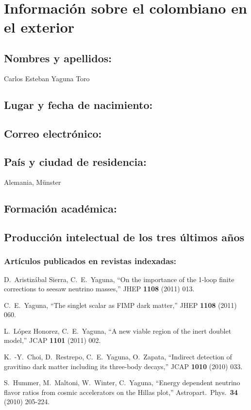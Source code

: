 \section{Información sobre el colombiano en el exterior}
\subsection{Nombres y apellidos: }
Carlos Esteban Yaguna Toro
\subsection{Lugar y fecha de nacimiento: }
\fnyaguna
\subsection{Correo electrónico: }
\emyaguna
\subsection{País y ciudad de residencia: }
Alemania, M\"unster
\subsection{Formación académica:}
\subsection{Producción intelectual de los tres últimos años}
\subsubsection{Artículos publicados en revistas indexadas:}
  D.~Aristizábal Sierra, C.~E.~Yaguna,
  ``On the importance of the 1-loop finite corrections to seesaw neutrino masses,''
  JHEP {\bf 1108 } (2011)  013.

  C.~E.~Yaguna,
  ``The singlet scalar as FIMP dark matter,''
  JHEP {\bf 1108 } (2011)  060.

  L.~López Honorez, C.~E.~Yaguna,
  ``A new viable region of the inert doublet model,''
  JCAP {\bf 1101 } (2011)  002.

  K.~-Y.~Choi, D.~Restrepo, C.~E.~Yaguna, O.~Zapata,
  ``Indirect detection of gravitino dark matter including its three-body decays,''
  JCAP {\bf 1010 } (2010)  033.

  S.~Hummer, M.~Maltoni, W.~Winter, C.~Yaguna,
  ``Energy dependent neutrino flavor ratios from cosmic accelerators on the Hillas plot,''
  Astropart.\ Phys.\  {\bf 34 } (2010)  205-224.

